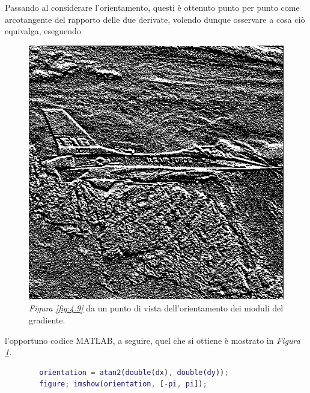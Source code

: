 \documentclass{subfiles}
\begin{document}
Passando al considerare l'orientamento, questi è ottenuto punto per punto come arcotangente del rapporto delle due derivate,
volendo dunque osservare a cosa ciò equivalga, eseguendo
\begin{figure}
    \centering
    \includegraphics[scale = 0.325]{../Images/Airplane/OrientationAirplane.png}
    \caption{\emph{Figura \ref{fig:4.9}} da un punto di vista dell'orientamento dei moduli del gradiente.}
    \label{fig:4.11}
\end{figure}
l'opportuno codice MATLAB, a seguire, quel che si ottiene è mostrato in \emph{Figura \ref{fig:4.11}}.
\begin{center}
    \begin{lstlisting}[language = MATLAB]
        % dx e dy sono le immagine sin ora calcolate
        orientation = atan2(double(dx), double(dy));
        figure; imshow(orientation, [-pi, pi]);
    \end{lstlisting}
\end{center}
\end{document}
